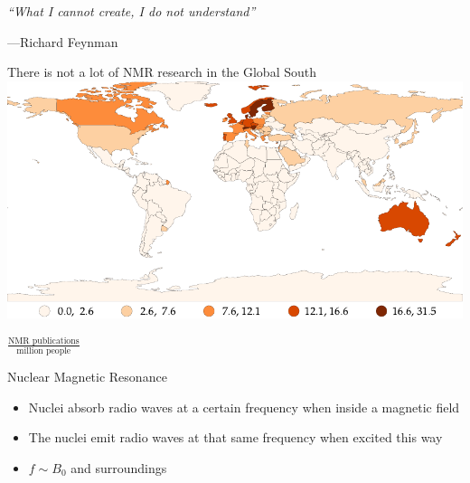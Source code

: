 \documentclass{ethpresentation}
\title{\Huge\magnethical}
\subtitle{Master Thesis: Building a 25\,MHz NMR Spectrometer}
\date{\today}
\author{Maximilian Stabel}
\institute{ETH Zürich}
\begin{document}
\maketitle %

\begin{frame}
  \centering
  \emph{\enquote{What I cannot create, I do not understand}}

  \vspace{\baselineskip}

  \hfill{}---Richard Feynman
\end{frame}

\begin{frame}{There is not a lot of NMR research in the Global South}
  \centering
  \includegraphics[height=0.8\textheight]{images/nmr-affiliations-per-million-people_naturalbreaks.pdf}

  \(\frac{\text{NMR publications}}{\text{million people}}\)
\end{frame}

\begin{frame}{Nuclear Magnetic Resonance}
  \begin{itemize}
    \item Nuclei absorb radio waves at a certain frequency when inside a magnetic field
    \item The nuclei emit radio waves at that same frequency when excited this way
    \item \(f \sim{} B_0\) and surroundings
  \end{itemize}
\end{frame}
\end{document}
